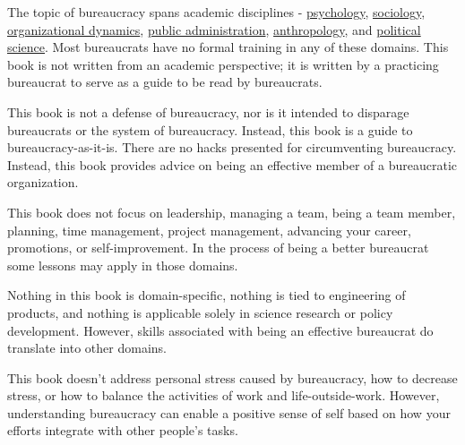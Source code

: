 The topic of bureaucracy spans academic disciplines - \href{https://en.wikipedia.org/wiki/Psychology}{psychology},
\href{https://en.wikipedia.org/wiki/Sociology}{sociology},
\href{https://en.wikipedia.org/wiki/Organizational_behavior}{organizational dynamics},
\href{https://en.wikipedia.org/wiki/Public_administration}{public administration}, 
\href{https://en.wikipedia.org/wiki/Anthropology}{anthropology},
and  
\href{https://en.wikipedia.org/wiki/Political_science}{political science}. 
Most bureaucrats have no formal training in any of these domains. This book is not written from an academic perspective; it is written by a practicing bureaucrat to serve as a guide to be read by bureaucrats. 

This book is not a defense of bureaucracy, nor is it intended to disparage bureaucrats or the system of bureaucracy. Instead, this book is a guide to bureaucracy-as-it-is. There are no hacks presented for circumventing bureaucracy. Instead, this book provides advice on being an effective member of a bureaucratic organization.

This book does not focus on leadership, managing a team, being a team member, planning, time management, project management, advancing your career, promotions, or self-improvement. In the process of being a better bureaucrat some lessons may apply in those domains.


Nothing in this book is domain-specific, nothing is tied to engineering of products, and nothing is applicable solely in science research or policy development. However, skills associated with being an effective bureaucrat do translate into other domains.

This book doesn't address personal stress caused by bureaucracy, how to decrease stress, or how to balance the activities of work and life-outside-work.   However, understanding bureaucracy can enable a positive sense of self based on how your efforts integrate with other people's tasks. 


